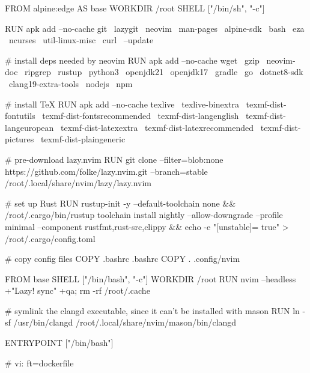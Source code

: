 FROM alpine:edge AS base
WORKDIR /root
SHELL ["/bin/sh", "-c"]

RUN apk add --no-cache git \
                       lazygit \
                       neovim \
                       man-pages \
                       alpine-sdk \
                       bash \
                       eza \
                       ncurses \
                       util-linux-misc \
                       curl \
                       --update

# install deps needed by neovim
RUN apk add --no-cache wget \
                       gzip \
                       neovim-doc \
                       ripgrep \
                       rustup \
                       python3 \
                       openjdk21 \
                       openjdk17 \
                       gradle \
                       go \
                       dotnet8-sdk \
                       clang19-extra-tools \
                       nodejs \
                       npm 

# install TeX
RUN apk add --no-cache texlive \
                       texlive-binextra \
                       texmf-dist-fontutils \
                       texmf-dist-fontsrecommended \
                       texmf-dist-langenglish \
                       texmf-dist-langeuropean \
                       texmf-dist-latexextra \
                       texmf-dist-latexrecommended \
                       texmf-dist-pictures \
                       texmf-dist-plaingeneric 

# pre-download lazy.nvim
RUN git clone --filter=blob:none https://github.com/folke/lazy.nvim.git --branch=stable /root/.local/share/nvim/lazy/lazy.nvim

# set up Rust
RUN rustup-init -y --default-toolchain none && /root/.cargo/bin/rustup toolchain install nightly --allow-downgrade --profile minimal --component rustfmt,rust-src,clippy && echo -e "[unstable]\ngc = true" > /root/.cargo/config.toml

# copy config files
COPY .bashrc .bashrc
COPY . .config/nvim

FROM base
SHELL ["/bin/bash", "-c"]
WORKDIR /root
RUN nvim --headless +"Lazy! sync" +qa; rm -rf /root/.cache

# symlink the clangd executable, since it can't be installed with mason
RUN ln -sf /usr/bin/clangd /root/.local/share/nvim/mason/bin/clangd

ENTRYPOINT ["/bin/bash"]

# vi: ft=dockerfile
